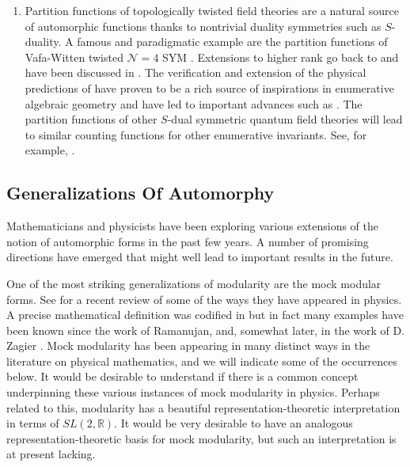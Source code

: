 \documentclass[12pt]{article}
\newcommand\CalN{\mathcal{N}}
\begin{document}
\begin{enumerate}
\item Partition functions of topologically twisted field theories 
are a natural source of automorphic functions thanks to nontrivial duality symmetries such as $S$-duality. A famous and paradigmatic example are the partition functions of Vafa-Witten twisted ${\CalN}=4$ SYM \cite{Vafa:1994tf}.
Extensions to higher rank go back to \cite{Minahan:1998vr} and have been discussed in \cite{Manschot:2011dj,Manschot:2014cca,Manschot:2017xcr,Alexandrov:2019rth}. 
The verification and extension of the physical predictions of  
have proven to be a rich source of inspirations in enumerative 
algebraic geometry and have led to important advances such as 
\cite{Sheshmani:2019tvp,Tanaka:2017jom,Tanaka:2017bcw,Thomas:2018lvm}.
The partition functions of other $S$-dual symmetric quantum field theories
will lead to similar counting functions for other enumerative invariants. 
See, for example,   \cite{Manschot:2021qqe}.


\end{enumerate}

 


\subsection{Generalizations Of Automorphy}


Mathematicians and physicists have been exploring various 
extensions of the notion of automorphic forms in the past 
few years. A number of promising directions have emerged
that might well lead to important results in the future. 

One of the most striking generalizations of modularity 
are the mock modular forms. See \cite{Dabholkar:2021lzt}  for a 
recent review of some of the ways they have appeared in physics. 
 A precise mathematical definition 
was codified in \cite{zwegers2008mock} but in fact many 
examples have been known since the work of Ramanujan, and, somewhat later, in the work of D. Zagier 
\cite{ZagierNombre,HirzebruchZagier}.
Mock modularity has been appearing in many distinct ways 
in the literature on physical mathematics, and we will 
indicate some of the occurrences below. 
It would be desirable to understand if there is a common concept
underpinning these various instances of mock modularity in physics.
Perhaps related to this, modularity has a beautiful representation-theoretic interpretation in terms of $SL(2,\mathbb{R})$. It would be very desirable to have an analogous representation-theoretic basis for mock modularity, but such an interpretation is at present lacking. 
\end{document}
